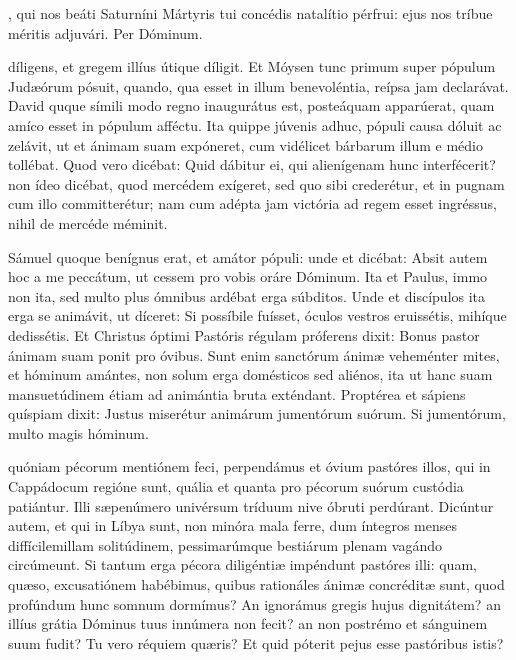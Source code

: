 \documentclass[fontsize=9pt,paper=A6,twoside,BCOR=1mm,DIV=22,headinclude]{scrarticle}
\begin{document}
\begin{multicols}{2}
{\Te 


\AiM 

\VRMi 

, qui nos beáti Saturníni Mártyris tui concédis natalítio pérfrui: ejus nos tríbue méritis adjuvári. Per Dóminum.

}


{
 díligens, et gregem illíus útique díligit. Et Móysen tunc primum super pópulum Judæórum pósuit, quando, qua esset in illum benevoléntia, reípsa jam declarávat. David quque símili modo regno inaugurátus est, posteáquam apparúerat, quam amíco esset in pópulum afféctu. Ita quippe júvenis adhuc, pópuli causa dóluit ac zelávit, ut et ánimam suam expóneret, cum vidélicet bárbarum illum e médio tollébat. Quod vero dicébat: Quid dábitur ei, qui alienígenam hunc interfécerit? non ídeo dicébat, quod mercédem exígeret, sed quo sibi crederétur, et in pugnam cum illo committerétur; nam cum adépta jam victória ad regem esset ingréssus, nihil de mercéde méminit.

\RVCPiv 

 Sámuel quoque benígnus erat, et amátor pópuli: unde et dicébat: Absit autem hoc a me peccátum, ut cessem pro vobis oráre Dóminum. Ita et Paulus, immo non ita, sed multo plus ómnibus ardébat erga súbditos. Unde et discípulos ita erga se animávit, ut díceret: Si possíbile fuísset, óculos vestros eruissétis, mihíque dedissétis. Et Christus óptimi Pastóris régulam próferens dixit: Bonus pastor ánimam suam ponit pro óvibus. Sunt enim sanctórum ánimæ veheménter mites, et hóminum amántes, non solum erga domésticos sed aliénos, ita ut hanc suam mansuetúdinem étiam ad animántia bruta exténdant. Proptérea et sápiens quíspiam dixit: Justus miserétur animárum jumentórum suórum. Si jumentórum, multo magis hóminum.

\RVCPv 

 quóniam pécorum mentiónem feci, perpendámus et óvium pastóres illos, qui in Cappádocum regióne sunt, quália et quanta pro pécorum suórum custódia patiántur. Illi sæpenúmero univérsum tríduum nive óbruti perdúrant. Dicúntur autem, et qui in Líbya sunt, non minóra mala ferre, dum íntegros menses diffícilemillam solitúdinem, pessimarúmque bestiárum plenam vagándo circúmeunt. Si tantum erga pécora diligéntiæ impéndunt pastóres illi: quam, quæso, excusatiónem habébimus, quibus rationáles ánimæ concréditæ sunt, quod profúndum hunc somnum dormímus? An ignorámus gregis hujus dignitátem? an illíus grátia Dóminus tuus innúmera non fecit? an non postrémo et sánguinem suum fudit? Tu vero réquiem quæris? Et quid póterit pejus esse pastóribus istis?

}
\end{multicols}
\end{document}

